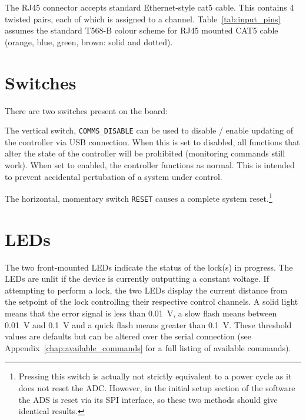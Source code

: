 \documentclass[11pt]{report}
\begin{document}
The RJ45 connector accepts standard Ethernet-style cat5 cable. This contains 4 twisted pairs, each of which is assigned to a channel. Table~\ref{tab:input_pins} assumes the standard T568-B colour scheme for RJ45 mounted CAT5 cable (orange, blue, green, brown: solid and dotted). 

\clearpage



\section{Switches} %
\label{sub:switches}

There are two switches present on the board:

The vertical switch, {\tt COMMS\_DISABLE} can be used to disable / enable updating of the controller via USB connection. When this is set to disabled, all functions that alter the state of the controller will be prohibited (monitoring commands still work). When set to enabled, the controller functions as normal. This is intended to prevent accidental pertubation of a system under control. 

The horizontal, momentary switch {\tt RESET} causes a complete system reset.\footnote{Pressing this switch is actually not strictly equivalent to a power cycle as it does not reset the ADC. However, in the initial setup section of the software the ADS is reset via its SPI interface, so these two methods should give identical results.}


\section{LEDs}

The two front-mounted LEDs indicate the status of the lock(s) in progress. The LEDs are unlit if the device is currently outputting a constant voltage. If attempting to perform a lock, the two LEDs display the current distance from the setpoint of the lock controlling their respective control channels. A solid light means that the error signal is less than \SI{0.01}{\volt}, a slow flash means between  \SI{0.01}{\volt} and  \SI{0.1}{\volt} and a quick flash means greater than  \SI{0.1}{\volt}. These threshold values are defaults but can be altered over the serial connection (see Appendix~\ref{chap:available_commands} for a full listing of available commands). 
\end{document}
